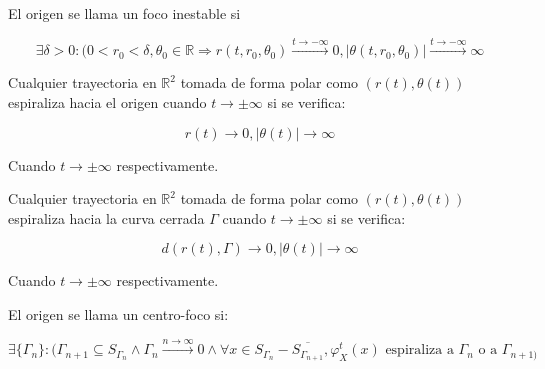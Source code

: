 \begin{defn}
	El origen se llama un foco inestable si
	
	\begin{equation*}
		\exists \delta>0: (0 < r_0 < \delta , \theta_0 \in \mathbb{R} \Rightarrow r(t,r_0,\theta_0) \overset{t\to -\infty}{\to} 0 , |\theta(t,r_0,\theta_0)| \overset{t\to -\infty}{\to} \infty 
	\end{equation*}
\end{defn}

\begin{defn}
	Cualquier trayectoria en $\mathbb{R}^2$ tomada de forma polar como $(r(t),\theta(t))$ espiraliza hacia el origen cuando $t\to \pm \infty$ si se verifica:
	
	\begin{equation*}
		r(t) \to 0, |\theta(t)| \to \infty
	\end{equation*}
	
	Cuando $t\to \pm \infty$ respectivamente.
\end{defn}

\begin{defn}
	Cualquier trayectoria en $\mathbb{R}^2$ tomada de forma polar como $(r(t),\theta(t))$ espiraliza hacia la curva cerrada $\Gamma$ cuando $t\to \pm \infty$ si se verifica:
	
	\begin{equation*}
		d(r(t),\Gamma) \to 0, |\theta(t)| \to \infty
	\end{equation*}
	
	Cuando $t\to \pm \infty$ respectivamente.
\end{defn}

\begin{defn}
	El origen se llama un centro-foco si:
	
	\begin{equation*}
		\exists \{\Gamma_n\}:(  \Gamma_{n+1} \subseteq S_{\Gamma_n} \land \Gamma_n \overset{n \to \infty }{\to} 0 \land \forall x \in S_{\Gamma_n}-\overline{S_{\Gamma_{n+1}}}, \varphi^t_{X}(x) \text{ espiraliza a } \Gamma_n  \text{ o a } \Gamma_{n+1)} 
	\end{equation*}
\end{defn}

